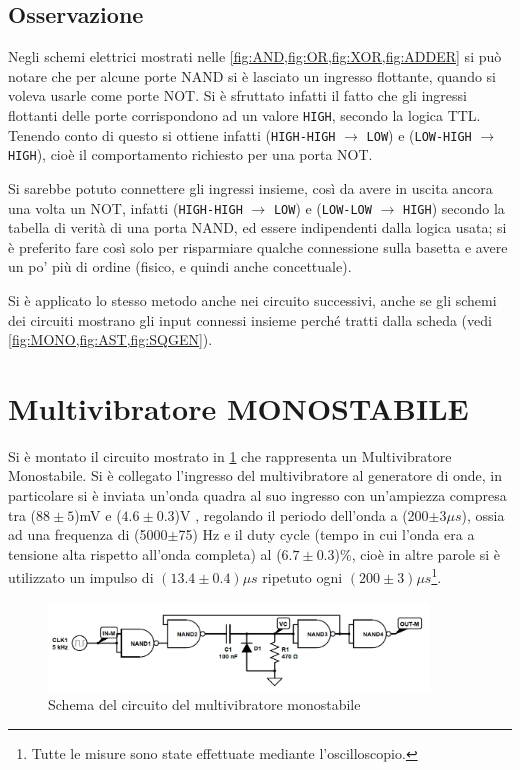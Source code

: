 \documentclass[a4paper,10pt]{article}
\def\code#1{\texttt{#1}}
\begin{document}
\subsection{Osservazione} Negli schemi elettrici mostrati nelle \cref{fig:AND,fig:OR,fig:XOR,fig:ADDER} si può notare che per alcune porte NAND si è lasciato un ingresso flottante, quando si voleva usarle come porte NOT. Si è sfruttato infatti il fatto che gli ingressi flottanti delle porte corrispondono ad un valore \code{HIGH}, secondo la logica TTL.
Tenendo conto di questo si ottiene infatti (\code{HIGH-HIGH} $\rightarrow$ \code{LOW}) e (\code{LOW-HIGH} $\rightarrow$ \code{HIGH}), cioè il comportamento richiesto per una porta NOT.

Si sarebbe potuto connettere gli ingressi insieme, così da avere in uscita ancora una volta un NOT, infatti (\code{HIGH-HIGH} $\rightarrow$ \code{LOW}) e (\code{LOW-LOW} $\rightarrow$ \code{HIGH}) secondo la tabella di verità di una porta NAND, ed essere indipendenti dalla logica usata; si è preferito fare così solo per risparmiare qualche connessione sulla basetta e avere un po' più di ordine (fisico, e quindi anche concettuale).

Si è applicato lo stesso metodo anche nei circuito successivi, anche se gli schemi dei circuiti mostrano gli input connessi insieme perché tratti dalla scheda (vedi \cref{fig:MONO,fig:AST,fig:SQGEN}).


\section{Multivibratore MONOSTABILE}
Si è montato il circuito mostrato in \cref{fig:MONO} che rappresenta un Multivibratore Monostabile. Si è collegato l'ingresso del multivibratore al generatore di onde, in particolare si è inviata un'onda quadra al suo ingresso con un'ampiezza compresa tra ($88\pm5$)mV e ($4.6\pm0.3$)V , regolando il periodo dell'onda a (200$\pm 3 \mu s$), ossia ad una frequenza di (5000$\pm$75) Hz e il duty cycle (tempo in cui l'onda era a tensione alta rispetto all'onda completa) al ($6.7\pm0.3$)\%, cioè in altre parole si è utilizzato un impulso di $(13.4\pm0.4) \mu s$ ripetuto ogni $(200\pm3) \mu s$\footnote{Tutte le misure sono state effettuate mediante l'oscilloscopio.}.


\begin{figure}[H]
	\centering
	\includegraphics[width=0.9\textwidth]{../grafici/Monostabile.png}
	\caption{Schema del circuito del multivibratore monostabile}
	\label{fig:MONO}
\end{figure}
\end{document}
